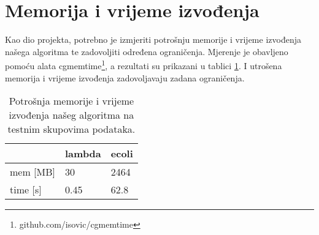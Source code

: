 \section{Memorija i vrijeme izvođenja}

Kao dio projekta, potrebno je izmjeriti potrošnju memorije i vrijeme izvođenja našega algoritma te zadovoljiti određena ograničenja.
Mjerenje je obavljeno pomoću alata cgmemtime\footnote{github.com/isovic/cgmemtime}, a rezultati su prikazani u tablici \ref{tbl:mem}.
I utrošena memorija i vrijeme izvođenja zadovoljavaju zadana ograničenja.

\begin{table}[]
\centering
\caption{Potrošnja memorije i vrijeme izvođenja našeg algoritma na testnim skupovima podataka.}
\label{tbl:mem}
\begin{tabular}{l|ll}
  & lambda & ecoli \\ \hline
  mem {[}MB{]} & 30     & 2464  \\
  time {[}s{]} & 0.45   & 62.8 
\end{tabular}
\end{table}

